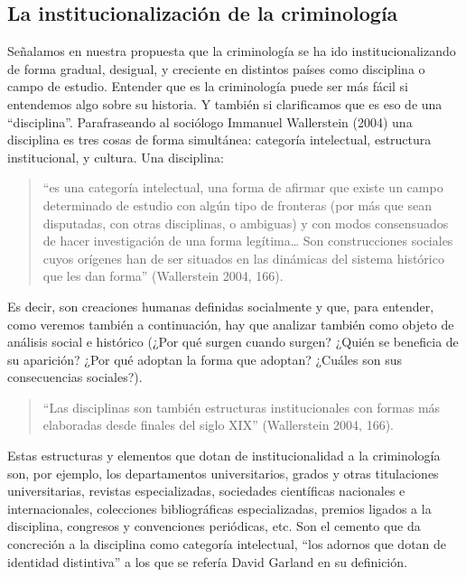 \documentclass[
  spanish,
  letterpaper,
  DIV=11,
  numbers=noendperiod]{scrreprt}
\begin{document}
\subsection{La institucionalización de la
criminología}\label{la-institucionalizaciuxf3n-de-la-criminologuxeda}

Señalamos en nuestra propuesta que la criminología se ha ido
institucionalizando de forma gradual, desigual, y creciente en distintos
países como disciplina o campo de estudio. Entender que es la
criminología puede ser más fácil si entendemos algo sobre su historia. Y
también si clarificamos que es eso de una ``disciplina''. Parafraseando
al sociólogo Immanuel Wallerstein (2004) una disciplina es tres cosas de
forma simultánea: categoría intelectual, estructura institucional, y
cultura. Una disciplina:

\begin{quote}
``es una categoría intelectual, una forma de afirmar que existe un campo
determinado de estudio con algún tipo de fronteras (por más que sean
disputadas, con otras disciplinas, o ambiguas) y con modos consensuados
de hacer investigación de una forma legítima\ldots{} Son construcciones
sociales cuyos orígenes han de ser situados en las dinámicas del sistema
histórico que les dan forma'' (Wallerstein 2004, 166).
\end{quote}

Es decir, son creaciones humanas definidas socialmente y que, para
entender, como veremos también a continuación, hay que analizar también
como objeto de análisis social e histórico (¿Por qué surgen cuando
surgen? ¿Quién se beneficia de su aparición? ¿Por qué adoptan la forma
que adoptan? ¿Cuáles son sus consecuencias sociales?).

\begin{quote}
``Las disciplinas son también estructuras institucionales con formas más
elaboradas desde finales del siglo XIX'' (Wallerstein 2004, 166).
\end{quote}

Estas estructuras y elementos que dotan de institucionalidad a la
criminología son, por ejemplo, los departamentos universitarios, grados
y otras titulaciones universitarias, revistas especializadas, sociedades
científicas nacionales e internacionales, colecciones bibliográficas
especializadas, premios ligados a la disciplina, congresos y
convenciones periódicas, etc. Son el cemento que da concreción a la
disciplina como categoría intelectual, ``los adornos que dotan de
identidad distintiva'' a los que se refería David Garland en su
definición.
\end{document}
